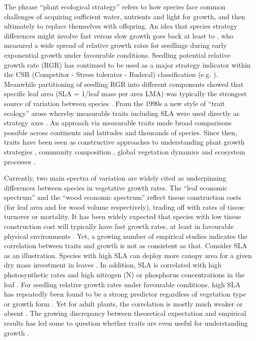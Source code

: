 \documentclass[a4paper,11pt]{article}
\begin{document}
The phrase ``plant ecological strategy'' refers to how species face common challenges of acquiring sufficient water, nutrients and light for growth, and then ultimately to replace themselves with offspring. An idea that species strategy differences might involve fast versus slow growth goes back at least to \citet{Grime:1975gr}, who measured a wide spread of relative growth rates for seedlings during early exponential growth under favourable conditions. Seedling potential relative growth rate (RGR) has continued to be used as a major strategy indicator within the CSR (Competitor - Stress tolerator - Ruderal) classification (e.g. \citealt{grime1979plant, Grime:1997wm}). Meanwhile partitioning of seedling RGR into different components showed that specific leaf area (SLA = 1/leaf mass per area LMA) was typically the strongest source of variation between species \citep{Poorter:1989tx}. From the 1990s a new style of ``trait ecology'' arose whereby measurable traits including SLA were used directly as strategy axes \citep{Westoby:2002ft}. An approach via measurable traits made broad comparisons possible across continents and latitudes and thousands of species. Since then, traits have been seen as constructive approaches to understanding plant growth strategies \citep{Grime:1977kc,Chapin:1980gz}, community composition \citep{Lavorel:2002ff,Shipley:2006ie}, global vegetation dynamics \citep{Scheiter:2013ed} and ecosystem processes \citep{Lavorel:2002ff}.

Currently, two main spectra of variation are widely cited as underpinning differences between species in vegetative growth rates. The ``leaf economic spectrum'' \citep{Wright:2004jb} and the ``wood economic spectrum'' \citep{Chave:2009iy} reflect tissue construction costs (for leaf area and for wood volume respectively), trading off with rates of tissue turnover or mortality. It has been widely expected that species with low tissue construction cost will typically have fast growth rates, at least in favourable physical environments \citep[e.g.][]{MullerLandau:2004dc,Wright:2004jb,Poorter:2008iu,Chave:2009iy,Larjavaara:2010bn,Iida:2012jb,Paine:2015df}. Yet, a growing number of empirical studies indicates the correlation between traits and growth is not as consistent as that. Consider SLA as an illustration. Species with high SLA can deploy more canopy area for a given dry mass investment in leaves \citep{Poorter:1999wd, Reich:1992wm}. In addition, SLA is correlated with high photosynthetic rates and high nitrogen (N) or phosphorus concentrations in the leaf \citep{Wright:2004jb}. For seedling relative growth rates under favourable conditions, high SLA has repeatedly been found to be a strong predictor regardless of vegetation type or growth form \citep{Lambers:1992bj,Reich:1992wm,Grime:1997wm,Poorter:1999wd,Wright:1999ds}. Yet for adult plants, the correlation is mostly much weaker or absent \citep{coomes_comparison_1998,Poorter:2008iu,Aiba:2009ft,Easdale:2009gv,Wright:2010tp}. The growing discrepancy between theoretical expectation and empirical results has led some to question whether traits are even useful for understanding growth \citep{Wright:2010tp, Paine:2015df}.
\end{document}
